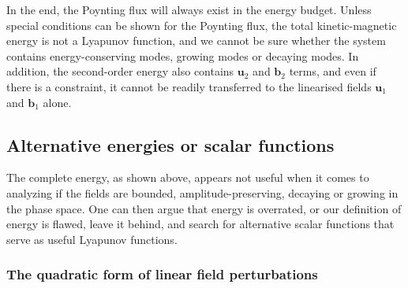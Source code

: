 %
In the end, the Poynting flux will always exist in the energy budget. Unless special conditions can be shown for the Poynting flux, the total kinetic-magnetic energy is not a Lyapunov function, and we cannot be sure whether the system contains energy-conserving modes, growing modes or decaying modes.
In addition, the second-order energy also contains $\mathbf{u}_2$ and $\mathbf{b}_2$ terms, and even if there is a constraint, it cannot be readily transferred to the linearised fields $\mathbf{u}_1$ and $\mathbf{b}_1$ alone.

\subsection{Alternative energies or scalar functions}

The complete energy, as shown above, appears not useful when it comes to analyzing if the fields are bounded, amplitude-preserving, decaying or growing in the phase space. One can then argue that energy is overrated, or our definition of energy is flawed, leave it behind, and search for alternative scalar functions that serve as useful Lyapunov functions.

\subsubsection{The quadratic form of linear field perturbations}

